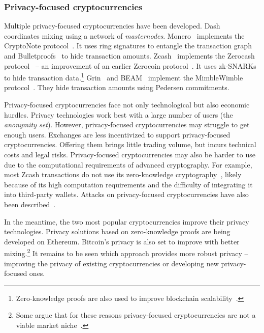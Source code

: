\subsubsection*{Privacy-focused cryptocurrencies}

Multiple privacy-focused cryptocurrencies have been developed.
Dash~\cite{Dash} coordinates mixing using a network of \textit{masternodes}.
Monero~\cite{Monero} implements the CryptoNote protocol~\cite{Saberhagen2013}.
It uses ring signatures to entangle the transaction graph and Bulletproofs~\cite{Buenz2018} to hide transaction amounts.
Zcash~\cite{Zcash} implements the Zerocash protocol~\cite{BenSasson2014, Hopwood2020} -- an improvement of an earlier Zerocoin protocol~\cite{Miers2013}.
It uses zk-SNARKs~\cite{BenSasson2014a} to hide transaction data.\footnote{Zero-knowledge proofs are also used to improve blockchain scalability~\cite{Bonneau2020}.}
Grin~\cite{Grin} and BEAM~\cite{Beam} implement the MimbleWimble protocol~\cite{Jedusor2016}.
They hide transaction amounts using Pedersen commitments.

Privacy-focused cryptocurrencies face not only technological but also economic hurdles.
Privacy technologies work best with a large number of users (the \textit{anonymity set}).
However, privacy-focused cryptocurrencies may struggle to get enough users.
Exchanges are less incentivized to support privacy-focused cryptocurrencies.
Offering them brings little trading volume, but incurs technical costs and legal risks.
Privacy-focused cryptocurrencies may also be harder to use due to the computational requirements of advanced cryptography.
For example, most Zcash transactions do not use its zero-knowledge cryptography~\cite{Quesnelle2017, Biryukov2019c}, likely because of its high computation requirements and the difficulty of integrating it into third-party wallets.
Attacks on privacy-focused cryptocurrencies have also been described~\cite{Quesnelle2017, Moeser2018, Biryukov2019d, Biryukov2019e, Tramer2020}.

In the meantime, the two most popular cryptocurrencies improve their privacy technologies.
Privacy solutions based on zero-knowledge proofs are being developed on Ethereum.
Bitcoin's privacy is also set to improve with better mixing.\footnote{Some argue that for these reasons privacy-focused cryptocurrencies are not a viable market niche~\cite{Gentry2019}.}
It remains to be seen which approach provides more robust privacy -- improving the privacy of existing cryptocurrencies or developing new privacy-focused ones.


